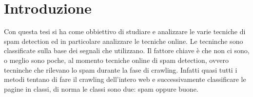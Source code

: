 \chapter{Introduzione}

Con questa tesi si ha come obbiettivo di studiare e analizzare le varie tecniche di spam detection ed in particolare analizzare le tecniche online. Le tecninche sono classificate sulla base dei segnali che utilizzano. Il fattore chiave è che non ci sono, o meglio sono poche, al momento tecniche online di spam detection, ovvero tecninche che rilevano lo spam durante la fase di crawling. Infatti quasi tutti i metodi tentano di fare il crawling dell'intero web e successivamente classificare le pagine in classi, di norma le classi sono due: spam oppure buone.

